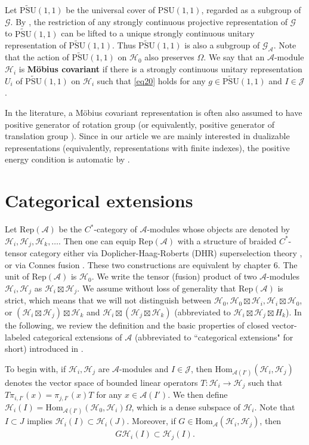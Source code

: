 \documentclass[12pt,a4paper]{article}
\theoremstyle{definition}
\theoremstyle{plain}
\newcommand{\mc}{\mathcal}
\newcommand{\Hom}{\mathrm{Hom}}
\newcommand{\PSU}{\mathrm{PSU}(1,1)}
\newcommand{\UPSU}{\widetilde{\mathrm{PSU}}(1,1)}
\newcommand{\GA}{\mathscr G_{\mathcal A}}
\newcommand{\scr}{\mathscr}
\newcommand{\RepA}{\mathrm{Rep}(\mc A)}
\numberwithin{equation}{section}
\begin{document}
Let $\UPSU$ be the universal cover of $\PSU$, regarded as a subgroup of $\scr G$. By \cite{Bar54}, the restriction of any strongly continuous projective representation of $\scr G$ to $\UPSU$ can be lifted to a unique strongly continuous unitary representation of $\UPSU$. Thus $\UPSU$ is also a subgroup of $\GA$. Note that  the action of $\UPSU$ on $\mc H_0$ also preserves $\Omega$. We say that an $\mc A$-module $\mc H_i$ is \textbf{M\"obius covariant} if there is a strongly continuous unitary representation $U_i$ of $\UPSU$ on $\mc H_i$ such that  \eqref{eq20} holds for any $g\in\UPSU$ and $I\in\mc J$.

In the literature, a M\"obius covariant representation is often also assumed to have positive generator of rotation group (or equivalently, positive generator of translation group \cite[Lemma 3.1]{Wei06}). Since in our article we are mainly interested in dualizable representations (equivalently, representations with finite indexes), the positive energy condition is automatic by \cite[Cor. 4.4]{BCL98}.  




\section{Categorical extensions}

Let $\RepA$ be the $C^*$-category of $\mc A$-modules whose objects are denoted by $\mc H_i,\mc H_j,\mc H_k,\dots$. Then one can equip $\RepA$ with a structure of braided $C^*$-tensor category either via Doplicher-Haag-Roberts (DHR) superselection theory \cite{FRS89,FRS92}, or via Connes fusion \cite{BDH15,BDH17,Gui21a}. These two constructions are equivalent by \cite{Gui21a} chapter 6. The unit of $\RepA$ is $\mc H_0$. We write the tensor (fusion) product of two $\mc A$-modules $\mc H_i,\mc H_j$ as $\mc H_i\boxtimes\mc H_j$. We assume without loss of generality that $\RepA$ is strict, which means that we will not distinguish between $\mc H_0,\mc H_0\boxtimes\mc H_i,\mc H_i\boxtimes\mc H_0$, or $(\mc H_i\boxtimes \mc H_j)\boxtimes\mc H_k$ and $\mc H_i\boxtimes(\mc H_j\boxtimes\mc H_k)$ (abbreviated to $\mc H_i\boxtimes\mc H_j\boxtimes H_k$). In the following, we review the definition and the basic properties of closed vector-labeled categorical extensions of $\mc A$ (abbreviated to ``categorical extensions" for short) introduced in \cite{Gui21a}.

To begin with, if $\mc H_i,\mc H_j$ are $\mc A$-modules and $I\in\mc J$, then $\Hom_{\mc A(I')}(\mc H_i,\mc H_j)$ denotes the vector space of bounded linear operators $T:\mc H_i\rightarrow\mc H_j$ such that $T\pi_{i,I'}(x)=\pi_{j,I'}(x)T$ for any $x\in\mc A(I')$. We then define $\mc H_i(I)=\Hom_{\mc A(I')}(\mc H_0,\mc H_i)\Omega$, which is a dense subspace of $\mc H_i$. Note that $I\subset J$ implies $\mc H_i(I)\subset\mc H_i(J)$. Moreover, if $G\in\Hom_{\mc A}(\mc H_i,\mc H_j)$, then
\begin{align}
G\mc H_i(I)\subset\mc H_j(I).\label{eq62}
\end{align}
\end{document}
